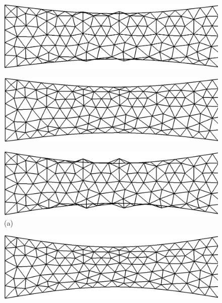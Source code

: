 \begin{figure}[H]
\begin{minipage}{.50\linewidth}
     \end{minipage}\\[7pt]
     \begin{minipage}{.50\linewidth}
      \centering
      \includegraphics[scale=0.19]{./02_chaps/cap_numerico/figure/no3.png}\\
     \end{minipage}%
     \begin{minipage}{.50\linewidth}
      \centering
      \includegraphics[scale=0.19]{./02_chaps/cap_numerico/figure/with3.png}\\
     \end{minipage}
     \begin{minipage}{.50\linewidth}
     \medskip
      \centering
      \includegraphics[scale=0.19]{./02_chaps/cap_numerico/figure/no4.png}\\
     (a)
     \end{minipage}%
     \begin{minipage}{.50\linewidth}
     \medskip
      \centering
      \includegraphics[scale=0.19]{./02_chaps/cap_numerico/figure/with4.png}\\

\end{minipage}
\end{figure}
